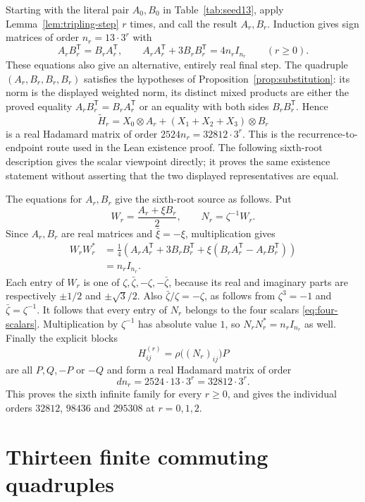 \documentclass[10pt]{article}
\begin{document}
Starting with the literal pair $A_0,B_0$ in Table~\ref{tab:seed13},
apply Lemma~\ref{lem:tripling-step} $r$ times, and call the result
$A_r,B_r$. Induction gives sign matrices of order $n_r=13\cdot3^r$
with
\[
 A_rB_r^{\mathsf T}=B_rA_r^{\mathsf T},\qquad
 A_rA_r^{\mathsf T}+3B_rB_r^{\mathsf T}=4n_rI_{n_r}
 \qquad(r\geq0).
\]
These equations also give an alternative, entirely real final step.
The quadruple $(A_r,B_r,B_r,B_r)$ satisfies the hypotheses of
Proposition~\ref{prop:substitution}: its norm is the displayed weighted
norm, its distinct mixed products are either the proved equality
$A_rB_r^{\mathsf T}=B_rA_r^{\mathsf T}$ or an equality with both sides
$B_rB_r^{\mathsf T}$. Hence
\[
 \widetilde H_r=X_0\otimes A_r+(X_1+X_2+X_3)\otimes B_r
\]
is a real Hadamard matrix of order $2524n_r=32812\cdot3^r$.
This is the recurrence-to-endpoint route used in the Lean existence
proof. The following sixth-root description gives the scalar viewpoint
directly; it proves the same existence statement without asserting that
the two displayed representatives are equal.

The equations for $A_r,B_r$ give the sixth-root source as follows.
Put
\[
 W_r=\frac{A_r+\xi B_r}{2},\qquad N_r=\zeta^{-1}W_r.
\]
Since $A_r,B_r$ are real matrices and $\bar\xi=-\xi$, multiplication
gives
\begin{align*}
 W_rW_r^*
 &=\frac14\left(A_rA_r^{\mathsf T}+3B_rB_r^{\mathsf T}
       +\xi(B_rA_r^{\mathsf T}-A_rB_r^{\mathsf T})\right)\\
 &=n_rI_{n_r}.
\end{align*}
Each entry of $W_r$ is one of
$\zeta,\bar\zeta,-\zeta,-\bar\zeta$, because its real and imaginary
parts are respectively $\pm1/2$ and $\pm\sqrt3/2$.
Also $\bar\zeta/\zeta=-\zeta$, as follows from
$\zeta^3=-1$ and $\bar\zeta=\zeta^{-1}$. It follows that every entry
of $N_r$ belongs to the four scalars \eqref{eq:four-scalars}.
Multiplication by $\zeta^{-1}$ has absolute value $1$, so
$N_rN_r^*=n_rI_{n_r}$ as well. Finally the explicit blocks
\[
 H^{(r)}_{ij}=\rho\bigl((N_r)_{ij}\bigr)P
\]
are all $P,Q,-P$ or $-Q$ and form a real Hadamard matrix of order
\[
 d n_r=2524\cdot13\cdot3^r=32812\cdot3^r.
\]
This proves the sixth infinite family for every $r\geq0$, and gives
the individual orders $32812$, $98436$ and $295308$ at $r=0,1,2$.


\section{Thirteen finite commuting quadruples}\label{sec:williamson}
\end{document}
